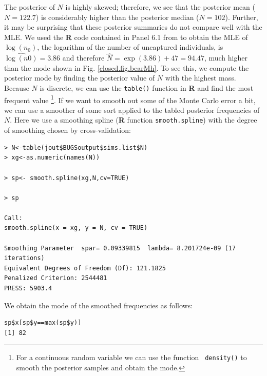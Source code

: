 The posterior of $N$ is highly skewed; therefore, we see that the 
posterior mean
($N=122.7$) is considerably higher than the posterior median
($N=102$).
Further, it may be surprising that these posterior
summaries do not compare well with the MLE.
We used 
the {\bf R} code contained in Panel 6.1 from
\citet{royle_dorazio:2008} to obtain the 
MLE of $\log(n_{0})$, the logarithm of the number of uncaptured
individuals, is $\widehat{\log(n0)} = 3.86$ and therefore $\hat{N} =
\exp(3.86)+47 = 94.47$, much higher than the mode 
shown in Fig. \ref{closed.fig.bearMh}.
To see this, we compute the posterior mode by finding
the posterior value of $N$ with the highest mass.
 Because $N$ is discrete, we can  use
the \mbox{\tt table()} function in {\bf R} and find the most frequent value
\footnote{For a continuous random variable we can use the function
 \mbox{\tt
    density()} to smooth the posterior samples and obtain the mode.}.
If we want to smooth out some of the Monte
Carlo error a bit, we can use a smoother of some sort applied to the tabled
posterior frequencies of $N$. Here we use a smoothing spline ({\bf R}
function \mbox{\tt smooth.spline}) with the
degree of smoothing chosen by cross-validation:
{\small
\begin{verbatim}
> N<-table(jout$BUGSoutput$sims.list$N)
> xg<-as.numeric(names(N))

> sp<- smooth.spline(xg,N,cv=TRUE)
 
> sp  

Call:
smooth.spline(x = xg, y = N, cv = TRUE)

Smoothing Parameter  spar= 0.09339815  lambda= 8.201724e-09 (17 iterations) 
Equivalent Degrees of Freedom (Df): 121.1825 
Penalized Criterion: 2544481 
PRESS: 5903.4 
\end{verbatim}
}
We obtain the mode of the smoothed frequencies as follows:
\begin{verbatim}
sp$x[sp$y==max(sp$y)]
[1] 82
\end{verbatim}


